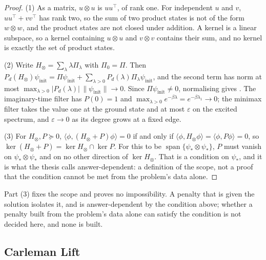 \begin{proof}
(1) As a matrix, $u\otimes u$ is $uu^{\top}$, of rank one. For independent $u$ and $v$, $uu^\top+vv^\top$ has rank two, so the sum of two product states is not of the form $w\otimes w$, and the product states are not closed under addition. A kernel is a linear subspace, so a kernel containing $u\otimes u$ and $v\otimes v$ contains their sum, and no kernel is exactly the set of product states.

(2) Write $H_\otimes=\sum_\lambda\lambda\Pi_\lambda$ with $\Pi_0=\Pi$. Then $P_d(H_\otimes)\psi_{\mathrm{init}}=\Pi\psi_{\mathrm{init}}+\sum_{\lambda>0}P_d(\lambda)\Pi_\lambda\psi_{\mathrm{init}}$, and the second term has norm at most $\max_{\lambda>0}|P_d(\lambda)|\,\|\psi_{\mathrm{init}}\|\to0$. Since $\Pi\psi_{\mathrm{init}}\ne0$, normalising gives . The imaginary-time filter has $P(0)=1$ and $\max_{\lambda>0}e^{-\beta\lambda}=e^{-\beta\lambda_1}\to0$; the minimax filter takes the value one at the ground state and at most $\varepsilon$ on the excited spectrum, and $\varepsilon\to0$ as its degree grows at a fixed edge.

(3) For $H_\otimes,P\succeq0$, $\langle\phi,(H_\otimes+P)\phi\rangle=0$ if and only if $\langle\phi,H_\otimes\phi\rangle=\langle\phi,P\phi\rangle=0$, so $\ker(H_\otimes+P)=\ker H_\otimes\cap\ker P$. For this to be $\operatorname{span}\{\psi_*\otimes\psi_*\}$, $P$ must vanish on $\psi_*\otimes\psi_*$ and on no other direction of $\ker H_\otimes$. That is a condition on $\psi_*$, and it is what the thesis calls answer-dependent: a definition of the scope, not a proof that the condition cannot be met from the problem's data alone.
\end{proof}
Part (3) fixes the scope and proves no impossibility. A penalty that is given the solution isolates it, and is answer-dependent by the condition above; whether a penalty built from the problem's data alone can satisfy the condition is not decided here, and none is built.

\subsection{Carleman Lift}
\label{app:carleman-layouts}

